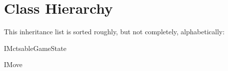 \section{Class Hierarchy}
This inheritance list is sorted roughly, but not completely, alphabetically\+:\begin{DoxyCompactList}
\item I\+Mctsable\+Game\+State\begin{DoxyCompactList}
\item {}
\end{DoxyCompactList}
\item I\+Move\begin{DoxyCompactList}
\item {}
\end{DoxyCompactList}
\end{DoxyCompactList}
